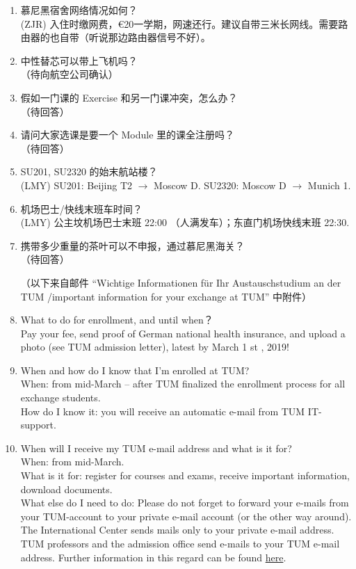 \documentclass{ctexart}
\begin{document}
\begin{enumerate}
  (ZJR) 可以。
  \item 慕尼黑宿舍网络情况如何？ \\
  (ZJR) 入住时缴网费，\euro{20}一学期，网速还行。建议自带三米长网线。需要路由器的也自带（听说那边路由器信号不好）。
  \item 中性替芯可以带上飞机吗？ \\
  （待向航空公司确认）
  \item 假如一门课的 Exercise 和另一门课冲突，怎么办？ \\
  （待回答）
  \item 请问大家选课是要一个 Module 里的课全注册吗？ \\
  （待回答）
  \item SU201, SU2320 的始末航站楼？ \\
  (LMY) SU201: Beijing T2 $\rightarrow$ Moscow D. SU2320: Moscow D $\rightarrow$ Munich 1.
  \item 机场巴士/快线末班车时间？ \\
  (LMY) 公主坟机场巴士末班 22:00 （人满发车）；东直门机场快线末班 22:30.
  \item 携带多少重量的茶叶可以不申报，通过慕尼黑海关？ \\
  （待回答）


  （以下来自邮件 ``Wichtige Informationen für Ihr Austauschstudium an der TUM /important information for your exchange at TUM'' 中附件）
  \item What to do for enrollment, and until when？ \\
  Pay your fee, send proof of German national health insurance, and upload a photo
  (see TUM admission letter), latest by March 1 st , 2019!
  \item When and how do I know that I’m enrolled at TUM? \\
  When: from mid-March – after TUM finalized the enrollment process for all exchange students. \\
  How do I know it: you will receive an automatic e-mail from TUM IT-support.
  \item When will I receive my TUM e-mail address and what is it for? \\
  When: from mid-March. \\
  What is it for: register for courses and exams, receive important information, download documents. \\
  What else do I need to do: Please do not forget to forward your e-mails from your TUM-account to your
  private e-mail account (or the other way around). The International Center sends mails only to your private
  e-mail address. TUM professors and the admission office send e-mails to your TUM e-mail address. Further
  information in this regard can be found \href{http://www.it.tum.de/en/faq/it-services/e-mail/}{here}.
\end{enumerate}
\end{document}
